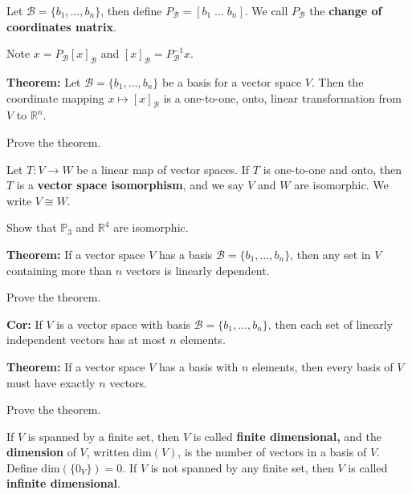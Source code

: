 \begin{enumerate}
\vfill

\begin{defn} Let $\mathcal{B}=\{b_1, \dots, b_n\}$, then define $P_\mathcal{B}=[b_1 \; \dots \; b_n]$. We call $P_\mathcal{B}$ the {\bf change of coordinates matrix}.
\end{defn}
Note $x = P_\mathcal{B} [x]_{\mathcal{B}}$ and $[x]_\mathcal{B}=P_{\mathcal{B}}^{-1} x.$

{\bf Theorem:} Let $\mathcal{B}=\{ b_1, \dots, b_n\}$ be a basis for a vector space $V$. Then the coordinate mapping $x \mapsto [x]_\mathcal{B}$ is a one-to-one, onto, linear transformation from $V$ to $\mathbb{R}^n$.

\Problem Prove the theorem.

\vfill

\newpage

\begin{defn}
	Let $T: V \to W$ be a linear map of vector spaces. If $T$ is one-to-one and onto, then $T$ is a {\bf vector space isomorphism}, and we say $V$ and $W$ are isomorphic. We write $V \cong W$.
\end{defn}

\Problem Show that $\mathbb{P}_3$ and $\mathbb{R}^4$ are isomorphic.

\vfill

{\bf Theorem:} If a vector space $V$ has a basis $\mathcal{B}=\{b_1, \dots, b_n\}$, then any set in $V$ containing more than $n$ vectors is linearly dependent.

\Problem Prove the theorem.

\vfill

{\bf Cor:} If $V$ is a vector space with basis $\mathcal{B}=\{b_1, \dots, b_n\}$, then each set of linearly independent vectors has at most $n$ elements.

{\bf Theorem:} If a vector space $V$ has a basis with $n$ elements, then every basis of $V$ must have exactly $n$ vectors.

\Problem Prove the theorem.

\vfill

\begin{defn}
If $V$ is spanned by a finite set, then $V$ is called {\bf finite dimensional,} and the {\bf dimension} of $V$, written $\text{dim}(V)$, is the number of vectors in a basis of $V$. Define $\text{dim}(\{0_V\})=0$. If $V$ is not spanned by any finite set, then $V$ is called {\bf infinite dimensional}.
\end{defn}

\end{enumerate}

